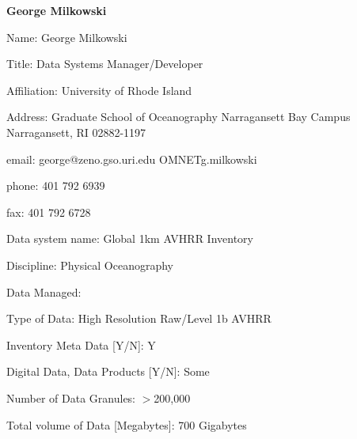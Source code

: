\begin{center}
\LARGE
{\bf  George Milkowski}
\end{center}
\large
{}
\normalsize
\smallskip
\begin{description}
\item{Name:}  George Milkowski
\item{Title:}  Data Systems Manager/Developer
\item{Affiliation:}  University of Rhode Island
\item{Address:}  Graduate School of Oceanography
			Narragansett Bay Campus
			Narragansett, RI 02882-1197
\item{email:}  george@zeno.gso.uri.edu OMNET{g.milkowski}
\item{phone:}  401 792 6939
\item{fax:}  401 792 6728
\end{description}
\medskip
\large
{}
\normalsize
\medskip
\begin{description}

\item{Data system name:}  Global 1km AVHRR Inventory
\item{Discipline:}  Physical Oceanography
\item{Data Managed:}
	\begin{description}
	\item{Type of Data:}  High Resolution Raw/Level 1b AVHRR
	\item{Inventory Meta Data [Y/N]:}  Y
	\item{Digital Data, Data Products [Y/N]:}  Some
	\item{Number of Data Granules:}  $>$200,000
	\item{Total volume of Data [Megabytes]:}  700 Gigabytes
	\end{description}
\end{description}

\medskip
\large
{}
\normalsize
\medskip

